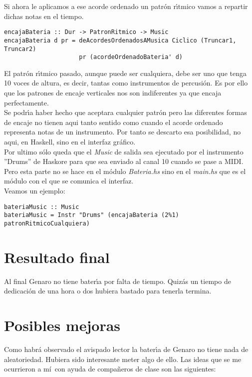 Si ahora le aplicamos a ese acorde ordenado un patr\'on r\'\i tmico vamos a repartir
dichas notas en el tiempo.

\small
\begin{verbatim}
encajaBateria :: Dur -> PatronRitmico -> Music
encajaBateria d pr = deAcordesOrdenadosAMusica Ciclico (Truncar1, Truncar2) 
                     pr (acordeOrdenadoBateria' d)
\end{verbatim}
\normalsize

\indent El patr\'on r\'\i tmico pasado, aunque puede ser cualquiera, debe ser uno que tenga 
10 voces de altura, es decir, tantas como instrumentos de percusi\'on. Es por
ello que los patrones de encaje verticales nos son indiferentes ya que encaja
perfectamente.\\
\indent Se podr\'\i a haber hecho que aceptara cualquier patr\'on pero las diferentes formas
de encaje no tienen aqui tanto sentido como cuando el acorde ordenado representa
notas de un instrumento. Por tanto se descarto esa posibilidad, no aqui, en Haskell,
sino en el interfaz gr\'afico.\\
\indent Por ultimo s\'olo queda que el \emph{Music} de salida sea ejecutado por el instrumento
''Drums'' de Haskore para que sea enviado al canal 10 cuando se pase a MIDI.
Pero esta parte no se hace en el m\'odulo \emph{Bateria.hs} sino en el \emph{main.hs} que es
el m\'odulo con el que se comunica el interfaz.\\
\indent Veamos un ejemplo:

\small
\begin{verbatim}
bateriaMusic :: Music
bateriaMusic = Instr "Drums" (encajaBateria (2%1) patronRitmicoCualquiera)
\end{verbatim}
\normalsize

\section{Resultado final}
Al final Genaro no tiene bater\'\i a por falta de tiempo. Quiz\'as un tiempo
de dedicaci\'on de una hora o dos hubiera bastado para tenerla termina.

\section{Posibles mejoras}
Como habr\'a observado el avispado lector la bater\'\i a de Genaro no tiene
nada de aleatoriedad. Hubiera sido interesante meter algo de ello. Las ideas
que se me ocurrieron a m\'i~con ayuda de compa\~neros de clase son las siguientes:

